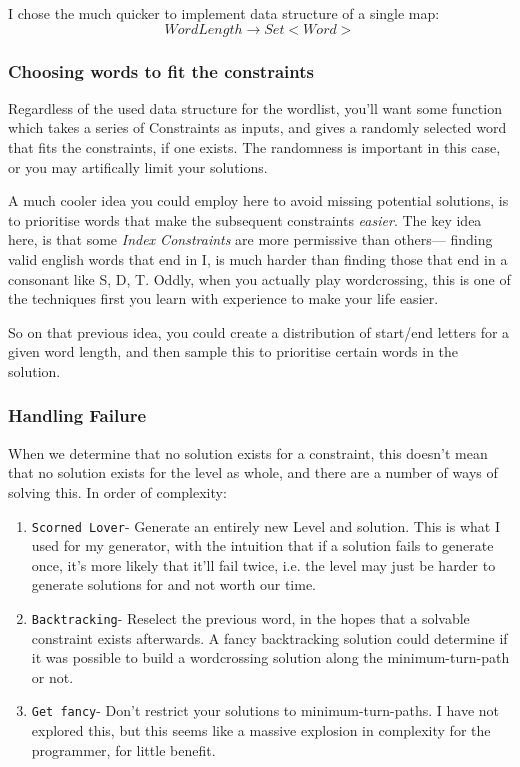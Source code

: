 \documentclass{article}
\begin{document}
I chose the much quicker to implement data structure of a single map:
\begin{displaymath}
  WordLength \rightarrow Set<Word>
\end{displaymath}


\subsubsection{Choosing words to fit the constraints}
Regardless of the used data structure for the wordlist, 
you'll want some function which takes a series of Constraints as inputs, 
and gives a randomly selected word that fits the constraints, if one exists.
The randomness is important in this case, or you may artifically 
limit your solutions.

A much cooler idea you could employ here to avoid missing potential solutions,
is to prioritise words that make the subsequent constraints \emph{easier}. The 
key idea here, is that some \emph{Index Constraints} are more permissive than others---
finding valid english words that end in I, is much harder than finding those 
that end in a consonant like S, D, T. Oddly, when you actually play 
wordcrossing, this is one of the techniques first you learn with experience 
to make your life easier.

So on that previous idea, you could create a distribution of start/end letters 
for a given word length, and then sample this to prioritise certain words in 
the solution.

\subsubsection{Handling Failure}
When we determine that no solution exists for a constraint, this doesn't mean that 
no solution exists for the level as whole, and there are a number of ways of solving this.
In order of complexity:

\begin{enumerate}
  \item \texttt{Scorned Lover}- Generate an entirely new Level and solution. 
    This is what I used for my generator, with the intuition that if a solution 
    fails to generate once, it's more likely that it'll fail twice, i.e. the 
    level may just be harder to generate solutions for and not worth our time.
  \item \texttt{Backtracking}- Reselect the previous word, in the hopes that a 
    solvable constraint exists afterwards. A fancy backtracking solution could
    determine if it was possible to build a wordcrossing solution along the 
    minimum-turn-path or not.
  \item \texttt{Get fancy}- Don't restrict your solutions to minimum-turn-paths.
    I have not explored this, but this seems like a massive explosion in complexity 
    for the programmer, for little benefit.
\end{enumerate}
\end{document}
